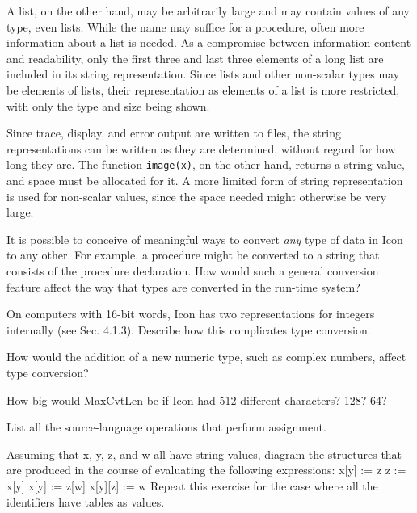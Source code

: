 A list, on the other hand, may be arbitrarily large and may contain
values of any type, even lists. While the name may suffice for a
procedure, often more information about a list is needed. As a
compromise between information content and readability, only the first
three and last three elements of a long list are included in its
string representation.  Since lists and other non-scalar types may be
elements of lists, their representation as elements of a list is more
restricted, with only the type and size being shown.

Since trace, display, and error output are written to files, the
string representations can be written as they are determined, without
regard for how long they are. The function \texttt{image(x)}, on the
other hand, returns a string value, and space must be allocated for
it. A more limited form of string representation is used for
non-scalar values, since the space needed might otherwise be very
large.


 It is possible to conceive of meaningful ways to convert
\textit{any} type of data in Icon to any other. For example, a
procedure might be converted to a string that consists of the
procedure declaration. How would such a general conversion feature
affect the way that types are converted in the run-time system?

 On computers with 16-bit words, Icon has two
representations for integers internally (see Sec. 4.1.3). Describe how
this complicates type conversion.

 How would the addition of a new numeric type,
such as complex numbers, affect type conversion?

 How big would MaxCvtLen be if Icon had 512
different characters?  128? 64?

 List all the source-language operations that
perform assignment.

 Assuming that x, y, z, and w all have string values, diagram the
structures that are produced in the course of evaluating the following
expressions:\newline
x[y] := z\newline
z := x[y]\newline
x[y] := z[w]\newline
x[y][z] := w\newline
Repeat this exercise for the case where all the identifiers have tables as values.

